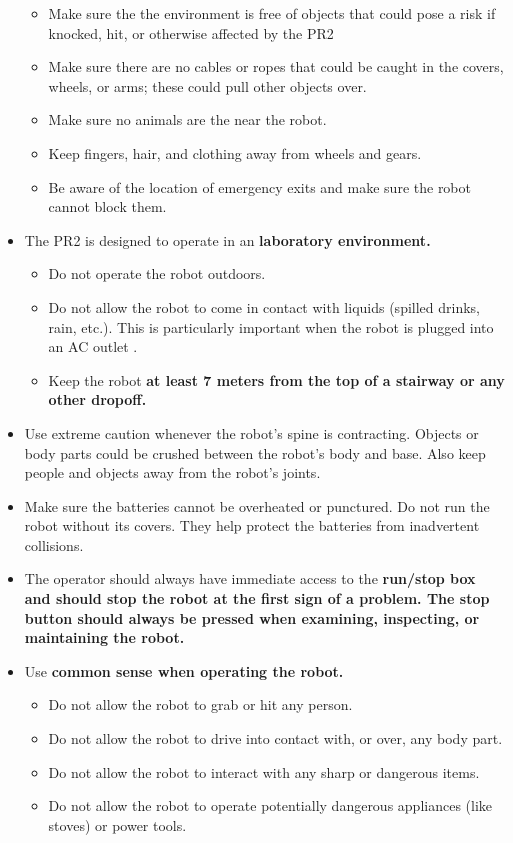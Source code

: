 \begin{itemize}
\begin{itemize}
\item Make sure the the environment is free of objects that could pose a risk if knocked, hit, or otherwise affected by the PR2
\item Make sure there are no cables or ropes that could be caught in the covers, wheels, or arms; these could pull other objects over.
\item Make sure no animals are the near the robot.
\item Keep fingers, hair, and clothing away from wheels and gears.
\item Be aware of the location of emergency exits and make sure the robot cannot block them.
\end{itemize}
\item The PR2 is designed to operate in an \bf{laboratory environment}.
\begin{itemize}
\item Do not operate the robot outdoors.
\item Do not allow the robot to come in contact with liquids (spilled drinks, rain, etc.). This is particularly important when the robot is plugged into an AC outlet .
\item Keep the robot \bf{at least 7 meters from the top of a stairway or any other dropoff}.
\end{itemize}
\item Use extreme caution whenever the robot's spine is contracting. Objects or body parts could be crushed between the robot's body and base. Also keep people and objects away from the robot's joints.
\item Make sure the batteries cannot be overheated or punctured.  Do not run the robot without its covers. They help protect the batteries from inadvertent collisions.
\item The operator should always have immediate access to the \bf{run/stop} box and should stop the robot at the first sign of a problem. The stop button should always be pressed when examining, inspecting, or maintaining the robot.
\item Use \bf{common sense} when operating the robot.
\begin{itemize}
\item Do not allow the robot to grab or hit any person.
\item Do not allow the robot to drive into contact with, or over, any body part.
\item Do not allow the robot to interact with any sharp or dangerous items.
\item Do not allow the robot to operate potentially dangerous appliances (like stoves) or power tools.

\end{itemize}
\end{itemize}

